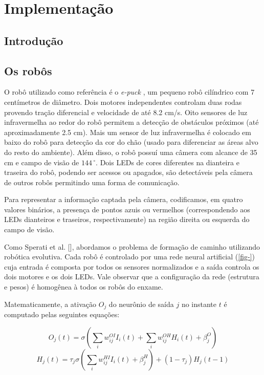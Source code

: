 \chapter{Implementação}
\label{implementacao}

\section{Introdução}

\section{Os robôs}

O robô utilizado como referência é o \textit{e-puck} \cite{mondada2009epuck}, um pequeno robô cilíndrico com 7 centímetros de diâmetro. Dois motores independentes controlam duas rodas provendo tração diferencial e velocidade de até 8.2 cm/s. Oito sensores de luz infravermelha ao redor do robô permitem a detecção de obstáculos próximos (até aproximadamente 2.5 cm). Mais um sensor de luz infravermelha é colocado em baixo do robô para detecção da cor do chão (usado para diferenciar as áreas alvo do resto do ambiente). Além disso, o robô possuí uma câmera com alcance de 35 cm e campo de visão de $144\,^{\circ}$. Dois LEDs de cores diferentes na dianteira e traseira do robô, podendo ser acessos ou apagados, são detectáveis pela câmera de outros robôs permitindo uma forma de comunicação.

Para representar a informação captada pela câmera, codificamos, em quatro valores binários, a presença de pontos azuis ou vermelhos (correspondendo aos LEDs dianteiros e traseiros, respectivamente) na região direita ou esquerda do campo de visão.

Como Sperati et al. [\cite{sperati2011path}], abordamos o problema de formação de caminho utilizando robótica evolutiva. Cada robô é controlado por uma rede neural artificial (\ref{fig-}) cuja entrada é composta por todos os sensores normalizados e a saída controla os dois motores e os dois LEDs. Vale observar que a configuração da rede (estrutura e pesos) é homogênea à todos os robôs do enxame.


Matematicamente, a ativação $O_{j}$ do neurônio de saída $j$ no instante $t$ é computado pelas seguintes equações:

$$
O_{j}(t) = \sigma (\sum_{i} w_{ij}^{OI} I_{i}(t) + \sum_{i} w_{ij}^{OH} H_{i}(t) + \beta_{j}^{O})
$$
$$
H_{j}(t) = \tau_{j} \sigma (\sum_{i} w_{ij}^{HI} I_{i}(t) + \beta_{j}^{H}) + (1 - \tau_{j}) H_{j} (t - 1)
$$

